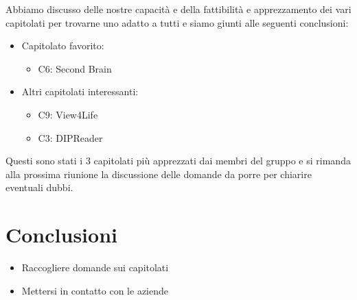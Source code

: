 \documentclass[a4paper,10pt]{article}
\begin{document}
\vspace{1\baselineskip}

Abbiamo discusso delle nostre capacità e della fattibilità e apprezzamento dei vari capitolati per trovarne uno adatto a tutti e siamo giunti alle seguenti conclusioni:
\begin{itemize}
    \item  Capitolato favorito:
    \begin{itemize}
        \item C6: Second Brain
    \end{itemize} 
    \item Altri capitolati interessanti:
    \begin{itemize}
        \item C9: View4Life
        \item C3: DIPReader
    \end{itemize}
\end{itemize}

Questi sono stati i 3 capitolati più apprezzati dai membri del gruppo e si rimanda alla prossima riunione la discussione delle domande da porre per chiarire eventuali dubbi.

\section*{Conclusioni}
\begin{itemize}
    \item Raccogliere domande sui capitolati
    \par
    \item Mettersi in contatto con le aziende
\end{itemize}
\end{document}
